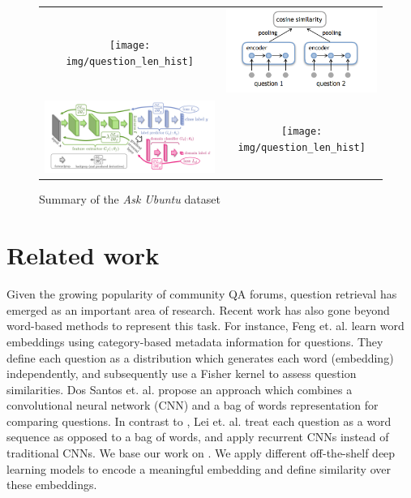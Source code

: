 \documentclass{sigkddExp}
\begin{document}
\begin{figure}[h]
\centering
\begin{tabular}{cc}
    \texttt{[image: img/question\_len\_hist]}
&   \includegraphics[width=\columnwidth]{img/similar}
\\
   \includegraphics[width=\columnwidth]{img/adversary}
&   \texttt{[image: img/question\_len\_hist]}
\end{tabular}
\label{fig:len_hist}
\caption{Summary of the \textit{Ask Ubuntu} dataset}
\end{figure}

\section{Related work}
\label{related}
Given the growing popularity of community QA forums, question retrieval has emerged as an important area of research. Recent work has also gone beyond word-based methods to represent this task. For instance, Feng et. al. \cite{feng2015applying} learn word embeddings using category-based metadata information for questions. They define each question as a distribution which generates each word (embedding) independently, and subsequently use a Fisher kernel to assess question similarities. Dos Santos et. al. \cite{dos2015learning} propose an approach which combines a convolutional neural network (CNN) and a bag of words representation for comparing questions. In contrast to \cite{feng2015applying}, Lei et. al. \cite{lei2015semi} treat each question as a word sequence as opposed to a bag of words, and apply recurrent CNNs instead of traditional CNNs. We base our work on \cite{lei2015semi}. We apply different off-the-shelf deep learning models to encode a meaningful embedding and define similarity over these embeddings.
\end{document}
